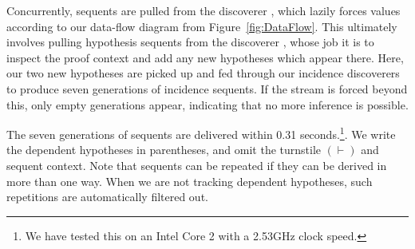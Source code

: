 Concurrently, sequents are pulled from the discoverer , which lazily forces values according to our data-flow diagram from Figure~\ref{fig:DataFlow}. This ultimately involves pulling hypothesis sequents from the discoverer , whose job it is to inspect the proof context and add any new hypotheses which appear there. Here, our two new hypotheses are picked up and fed through our incidence discoverers to produce seven generations of incidence sequents. If the stream is forced beyond this, only empty generations appear, indicating that no more inference is possible.

The seven generations of sequents are delivered within 0.31 seconds.\footnote{We have tested this on an Intel Core 2 with a 2.53GHz clock speed.}. We write the dependent hypotheses in parentheses, and omit the turnstile $(\vdash)$ and sequent context. Note that sequents can be repeated if they can be derived in more than one way. When we are not tracking dependent hypotheses, such repetitions are automatically filtered out.

